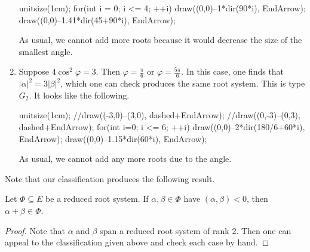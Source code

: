\documentclass[../notes.tex]{subfiles}
\begin{document}
\begin{enumerate}
	\begin{center}
		\begin{asy}
			unitsize(1cm);
			for(int i = 0; i <= 4; ++i)
			{
				draw((0,0)--1*dir(90*i), EndArrow);
				draw((0,0)--1.41*dir(45+90*i), EndArrow);
			}
		\end{asy}
	\end{center}
	As usual, we cannot add more roots because it would decrease the size of the smallest angle.
	\item Suppose $4\cos^2\varphi=3$. Then $\varphi=\frac{\pi}6$ or $\varphi=\frac{5\pi}6$. In this case, one finds that $\left|\alpha\right|^2=3\left|\beta\right|^2$, which one can check produces the same root system. This is type $G_2$. It looks like the following.
	\begin{center}
		\begin{asy}
			unitsize(1cm);
			//draw((-3,0)--(3,0), dashed+EndArrow);
			//draw((0,-3)--(0,3), dashed+EndArrow);
			for(int i=0; i <= 6; ++i)
			{
				draw((0,0)--2*dir(180/6+60*i), EndArrow);
				draw((0,0)--1.15*dir(60*i), EndArrow);
			}
		\end{asy}
	\end{center}
	As usual, we cannot add any more roots due to the angle.
\end{enumerate}
Note that our classification produces the following result.
\begin{corollary}
	Let $\Phi\subseteq E$ be a reduced root system. If $\alpha,\beta\in\Phi$ have $(\alpha,\beta)<0$, then $\alpha+\beta\in\Phi$.
\end{corollary}
\begin{proof}
	Note that $\alpha$ and $\beta$ span a reduced root system of rank $2$. Then one can appeal to the classification given above and check each case by hand.
\end{proof}
\end{document}
